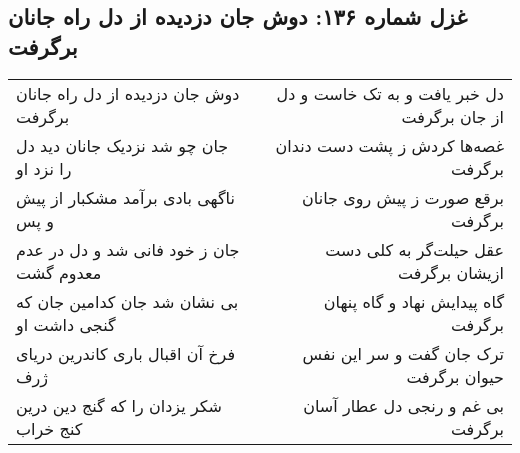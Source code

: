 \begin{center}
\section*{غزل شماره ۱۳۶: دوش جان دزدیده از دل راه جانان برگرفت}
\label{sec:136}
\begin{longtable}{l p{0.5cm} r}
دوش جان دزدیده از دل راه جانان برگرفت
&&
دل خبر یافت و به تک خاست و دل از جان برگرفت
\\
جان چو شد نزدیک جانان دید دل را نزد او
&&
غصه‌ها کردش ز پشت دست دندان برگرفت
\\
ناگهی بادی برآمد مشکبار از پیش و پس
&&
برقع صورت ز پیش روی جانان برگرفت
\\
جان ز خود فانی شد و دل در عدم معدوم گشت
&&
عقل حیلت‌گر به کلی دست ازیشان برگرفت
\\
بی نشان شد جان کدامین جان که گنجی داشت او
&&
گاه پیدایش نهاد و گاه پنهان برگرفت
\\
فرخ آن اقبال باری کاندرین دریای ژرف
&&
ترک جان گفت و سر این نفس حیوان برگرفت
\\
شکر یزدان را که گنج دین درین کنج خراب
&&
بی غم و رنجی دل عطار آسان برگرفت
\\
\end{longtable}
\end{center}
